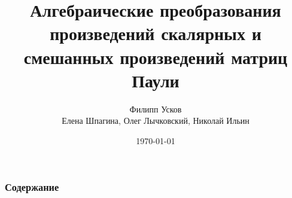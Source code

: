 \documentclass{beamer}
\title[Алгебраические преобразования $\sigma$-матриц]{Алгебраические   преобразования   произведений   скалярных   и   смешанных   произведений
матриц Паули} %
\author[Филипп Усков]{Филипп Усков\\[2mm]Елена Шпагина, Олег Лычковский, Николай Ильин} %
\institute[Сколтех] %
{
Сколтех; МГУ им. Ломоносова \\ %
\medskip
\textit{fel1992@mail.ru} %
}
\date{\today} %
\begin{document}
\begin{frame}
\titlepage %
\end{frame}

\begin{frame}
\frametitle{Содержание} %
\tableofcontents %
\end{frame}



\newcommand{\ssigma}{{\boldsymbol{\sigma}}}
\newcommand{\cc}{{\boldsymbol{\sigma}}}
\newcommand{\tr}{\mathrm{tr}}


\end{document}
